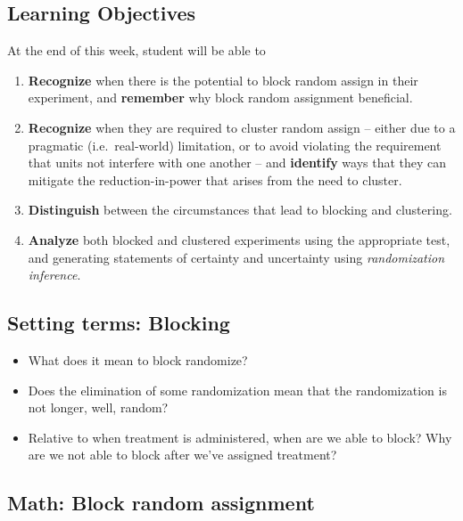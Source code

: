 \documentclass[
]{article}
\providecommand{\tightlist}{%
  \setlength{\itemsep}{0pt}\setlength{\parskip}{0pt}}
\theoremstyle{definition}
\theoremstyle{definition}
\theoremstyle{definition}
\theoremstyle{definition}
\theoremstyle{remark}
\begin{document}
\subsection{Learning Objectives}\label{learning-objectives-4}

At the end of this week, student will be able to

\begin{enumerate}
\def\labelenumi{\arabic{enumi}.}
\tightlist
\item
  \textbf{Recognize} when there is the potential to block random assign in their experiment, and \textbf{remember} why block random assignment beneficial.
\item
  \textbf{Recognize} when they are required to cluster random assign -- either due to a pragmatic (i.e.~real-world) limitation, or to avoid violating the requirement that units not interfere with one another -- and \textbf{identify} ways that they can mitigate the reduction-in-power that arises from the need to cluster.
\item
  \textbf{Distinguish} between the circumstances that lead to blocking and clustering.
\item
  \textbf{Analyze} both blocked and clustered experiments using the appropriate test, and generating statements of certainty and uncertainty using \emph{randomization inference}.
\end{enumerate}

\subsection{Setting terms: Blocking}\label{setting-terms-blocking}

\begin{itemize}
\tightlist
\item
  What does it mean to block randomize?
\item
  Does the elimination of some randomization mean that the randomization is not longer, well, random?
\item
  Relative to when treatment is administered, when are we able to block? Why are we not able to block after we've assigned treatment?
\end{itemize}

\subsection{Math: Block random assignment}\label{math-block-random-assignment}
\end{document}
